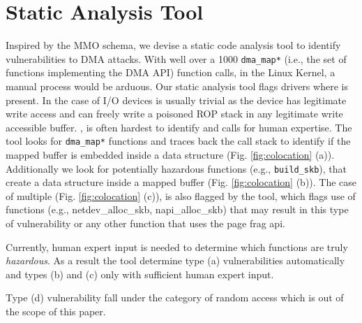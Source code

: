 \section{Static Analysis Tool}

Inspired by the MMO schema, we devise a static code analysis tool to identify vulnerabilities to DMA attacks. With well over a 1000 \texttt{dma\_map*} (i.e., the set of functions implementing the DMA API) function calls, in the Linux Kernel, a manual process would be arduous. Our static analysis tool flags drivers where \oportunity{} is present. In the case of I/O devices \motivation{} is usually trivial as the device has legitimate write access and can freely write a poisoned ROP stack in any legitimate write accessible buffer. \means{}, is often hardest to identify and calls for human expertise. The tool looks for \texttt{dma\_map*} functions and traces back the call stack to identify if the mapped buffer is embedded inside a data structure (Fig. \ref{fig:colocation} (a)). Additionally we look for potentially hazardous functions (e.g., \texttt{build\_skb}), that create a data structure inside a mapped buffer (Fig. \ref{fig:colocation} (b)). 
The case of multiple \iova{} (Fig. \ref{fig:colocation} (c)), is also flagged by the tool, which flags use of functions (e.g., netdev\_alloc\_skb, napi\_alloc\_skb) that may result in this type of vulnerability or any other function that uses the page frag api. 

Currently, human expert input is needed to determine which functions are truly \emph{hazardous}. As a result the tool determine type (a) vulnerabilities automatically and types (b) and (c) only with sufficient human expert input. 


Type (d) vulnerability fall under the category of random access 
which is out of the scope of this paper.

